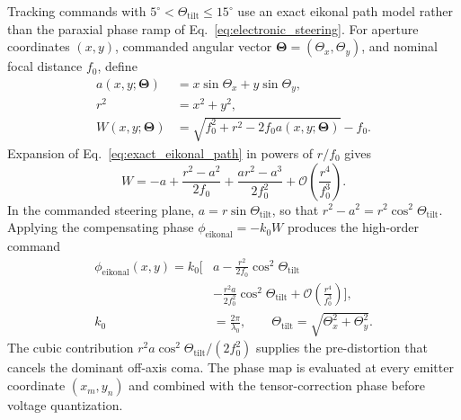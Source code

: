 \documentclass[10pt,twocolumn]{IEEEtran}
\begin{document}
Tracking commands with $5^{\circ}<\Theta_{\mathrm{tilt}}\leq15^{\circ}$ use an
exact eikonal path model rather than the paraxial phase ramp of
Eq.~\eqref{eq:electronic_steering}.  For aperture coordinates $(x,y)$,
commanded angular vector $\bm\Theta=(\Theta_x,\Theta_y)$, and nominal focal
distance $f_0$, define
\begin{equation}
\begin{aligned}
a(x,y;\bm\Theta)
&=x\sin\Theta_x+y\sin\Theta_y, \\
r^2&=x^2+y^2, \\
W(x,y;\bm\Theta)
&=\sqrt{f_0^2+r^2-2f_0a(x,y;\bm\Theta)}-f_0.
\end{aligned}
\label{eq:exact_eikonal_path}
\end{equation}
Expansion of Eq.~\eqref{eq:exact_eikonal_path} in powers of $r/f_0$ gives
\begin{equation}
W=-a+\frac{r^2-a^2}{2f_0}
+\frac{ar^2-a^3}{2f_0^2}
+\mathcal O\!\left(\frac{r^4}{f_0^3}\right).
\label{eq:eikonal_path_series}
\end{equation}
In the commanded steering plane, $a=r\sin\Theta_{\mathrm{tilt}}$, so that
$r^2-a^2=r^2\cos^2\Theta_{\mathrm{tilt}}$.  Applying the compensating phase
$\phi_{\mathrm{eikonal}}=-k_0W$ produces the high-order command
\begin{equation}
\begin{aligned}
\phi_{\mathrm{eikonal}}(x,y)
=k_0\biggl[&a
-\frac{r^2}{2f_0}\cos^2\Theta_{\mathrm{tilt}} \\
&-\frac{r^2a}{2f_0^2}\cos^2\Theta_{\mathrm{tilt}}
+\mathcal O\!\left(\frac{r^4}{f_0^3}\right)\biggr], \\
k_0&=\frac{2\pi}{\lambda_0},\qquad
\Theta_{\mathrm{tilt}}=\sqrt{\Theta_x^2+\Theta_y^2}.
\end{aligned}
\label{eq:nonparaxial_eikonal_phase}
\end{equation}
The cubic contribution
$r^2a\cos^2\Theta_{\mathrm{tilt}}/(2f_0^2)$ supplies the pre-distortion that
cancels the dominant off-axis coma.  The phase map is evaluated at every
emitter coordinate $(x_m,y_n)$ and combined with the tensor-correction phase
before voltage quantization.
\end{document}
